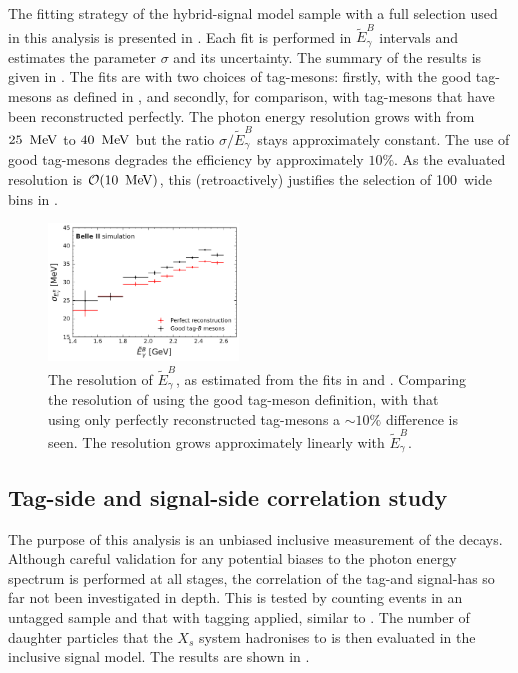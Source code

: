 The fitting strategy of the hybrid-signal model sample with a full selection used in this analysis is presented in .
Each fit is performed in $\tilde{E}_{\gamma}^{B}$ intervals and estimates the parameter $\sigma$ and its uncertainty.
The summary of the results is given in .
The fits are with two choices of tag-\B mesons: firstly, with the good tag-\B mesons as defined in ,
and secondly, for comparison, with tag-\B mesons that have been reconstructed perfectly.
The photon energy resolution grows with \EB from $25~\mathrm{\,Me\kern -0.1em V}$ to $40~\mathrm{\,Me\kern -0.1em V}$
but the ratio $\sigma/\tilde{E}_{\gamma}^{B}$ stays approximately constant.
The use of good tag-\B mesons degrades the efficiency by approximately $10\%$.
As the evaluated resolution is ${\cal O}(10~\mathrm{\,Me\kern -0.1em V})$, this (retroactively) justifies the selection of 100~\mev wide bins in .

\begin{figure}[htbp!]
    \centering
    \includegraphics[width=0.45\textwidth]{figures/signal_validation/resolution_bin_by_bin_withkstar.pdf}
    \caption{\label{fig:resolution_sigmas} The resolution of $\tilde{E}_{\gamma}^{B}$, 
    as estimated from the fits in  and .
    Comparing the resolution of \EB using the good tag-\B meson definition, with that using only perfectly reconstructed tag-\B mesons a $\sim10\%$ difference is seen.
    The resolution grows approximately linearly with $\tilde{E}_{\gamma}^{B}$.
    }
\end{figure}

\subsection{Tag-side and signal-side correlation study}\label{sec:inclusivity_study}

The purpose of this analysis is an unbiased inclusive measurement of the \BtoXsgamma decays.
Although careful validation for any potential biases to the photon energy spectrum is performed at all stages,
the correlation of the tag-\B and signal-\B has so far not been investigated in depth.
This is tested by counting \BtoXsgamma events in an untagged sample and that with \FEI tagging applied, similar to .
The number of daughter particles that the $X_s$ system hadronises to is then evaluated in the inclusive \BtoXsgamma signal model.
The results are shown in .

